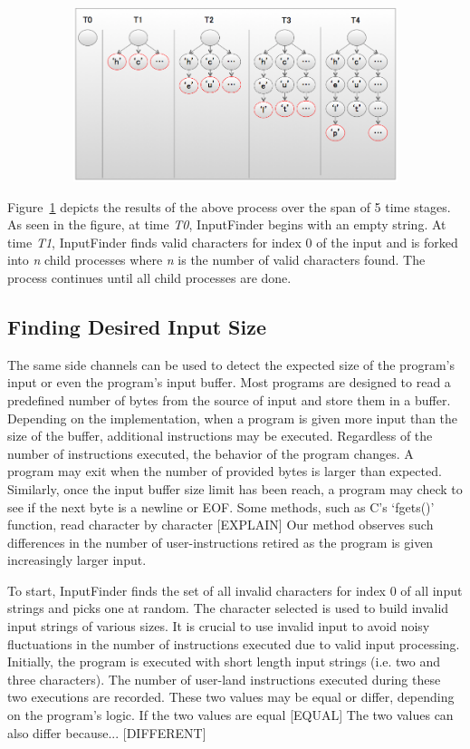 \documentclass{acm_proc_article-sp}
\def \tool {InputFinder}
\begin{document}
\begin{figure}[t]
\centering
\includegraphics[height=2in,width=6.5in]{string_builder.png}
\label{fig:string_builder}
\caption{}
\end{figure}

Figure~\ref{fig:string_builder} depicts the results of the above process over the span of 5 time stages.
As seen in the figure, at time \textit{T0}, \tool{} begins with an empty string.
At time \textit{T1}, \tool{} finds valid characters for index 0 of the input and is forked into \textit{n} child processes where \textit{n} is the number of valid characters found.
The process continues until all child processes are done.


\subsection{Finding Desired Input Size}

The same side channels can be used to detect the expected size of the program's input or even the program's input buffer.
Most programs are designed to read a predefined number of bytes from the source of input and store them in a buffer.
Depending on the implementation, when a program is given more input than the size of the buffer, additional instructions may be executed.
Regardless of the number of instructions executed, the behavior of the program changes.
A program may exit when the number of provided bytes is larger than expected.
Similarly, once the input buffer size limit has been reach, a program may check to see if the next byte is a newline or EOF.
Some methods, such as C's `fgets()' function, read character by character [EXPLAIN]
Our method observes such differences in the number of user-instructions retired as the program is given increasingly larger input.

To start, \tool{} finds the set of all invalid characters for index 0 of all input strings and picks one at random.
The character selected is used to build invalid input strings of various sizes.
It is crucial to use invalid input to avoid noisy fluctuations in the number of instructions executed due to valid input processing.
Initially, the program is executed with short length input strings (i.e. two and three characters).
The number of user-land instructions executed during these two executions are recorded.
These two values may be equal or differ, depending on the program's logic.
If the two values are equal [EQUAL]
The two values can also differ because... [DIFFERENT]
\end{document}
